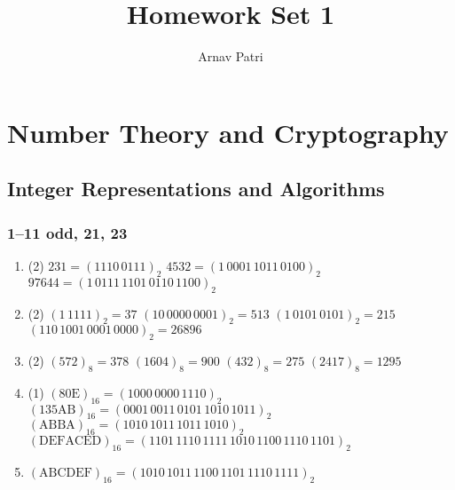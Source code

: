 \documentclass[12pt, A4]{article}
\title{Homework Set 1}
\author{Arnav Patri}
\newcommand{\enumset}[1]{\setcounter{enumi}{#1}}
\begin{document}
	\maketitle
	\setcounter{section}{3}
	\section{Number Theory and Cryptography}
		\setcounter{subsection}{1}
		\subsection{Integer Representations and Algorithms}
			\subsubsection*{1--11 odd, 21, 23}
				\begin{enumerate}
					\item
						\begin{tasks}(2)
							\task
								\(231 = (1110\, 0111)_2\)
							\task
								\(4532 = (1\, 0001\, 1011\, 0100)_2\)
							\task
								\(97644 = (1\, 0111\, 1101\, 0110\, 1100)_2\)
						\end{tasks}
					\enumset{2}
					\item
						\begin{tasks}(2)
							\task
								\((1\, 1111)_2 = 37\)
							\task
								\((10\, 0000\, 0001)_2 = 513\)
							\task
								\((1\, 0101\, 0101)_2 = 215\)
							\task
								\((110\, 1001\, 0001\, 0000)_2 = 26896\)
						\end{tasks}
					\enumset{4}
					\item
						\begin{tasks}(2)
							\task
								\((572)_8 = 378\)
							\task
								\((1604)_8 = 900\)
							\task
								\((432)_8 = 275\)
							\task
								\((2417)_8 = 1295\)
						\end{tasks}
					\enumset{6}
					\item
						\begin{tasks}(1)
							\task
								\((80\text{E})_{16} = (1000\, 0000\, 1110)_2\)
							\task
								\((135\text{AB})_{16} = (0001\, 0011\, 0101\, 1010\, 1011)_2\)
							\task
								\((\text{ABBA})_{16} = (1010\, 1011\, 1011\, 1010)_2\)
							\task
								\((\text{DEFACED})_{16} = (1101\, 1110\, 1111\, 1010\, 1100\, 1110\, 1101)_2\)
						\end{tasks}
					\enumset{8}
					\item
						\((\text{ABCDEF})_{16} = (1010\, 1011\, 1100\, 1101\, 1110\, 1111)_2\)

\end{enumerate}
\end{document}
